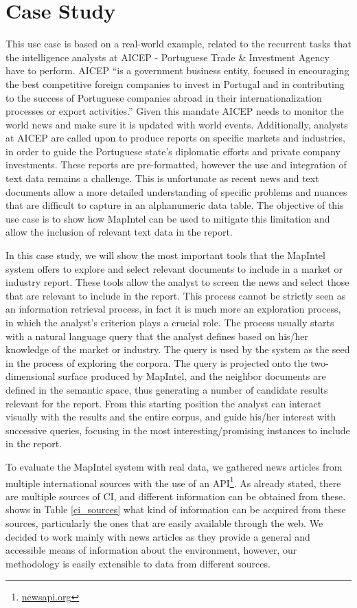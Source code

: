 \documentclass[a4paper]{article}
\begin{document}
\section{Case Study}
This use case is based on a real-world example, related to the recurrent tasks that the intelligence analysts at AICEP - Portuguese Trade \& Investment Agency have to perform. AICEP “is a government business entity, focused in encouraging the best competitive foreign companies to invest in Portugal and in contributing to the success of Portuguese companies abroad in their internationalization processes or export activities.” Given this mandate AICEP needs to monitor the world news and make sure it is updated with world events. Additionally, analysts at AICEP are called upon to produce reports on specific markets and industries, in order to guide the Portuguese state's diplomatic efforts and private company investments. These reports are pre-formatted, however the use and integration of text data remains a challenge. This is unfortunate as recent news and text documents allow a more detailed understanding of specific problems and nuances that are difficult to capture in an alphanumeric data table. The objective of this use case is to show how MapIntel can be used to mitigate this limitation and allow the inclusion of relevant text data in the report.

In this case study, we will show the most important tools that the MapIntel system offers to explore and select relevant documents to include in a market or industry report. These tools allow the analyst to screen the news and select those that are relevant to include in the report. This process cannot be strictly seen as an information retrieval process, in fact it is much more an exploration process, in which the analyst’s criterion plays a crucial role. The process usually starts with a natural language query that the analyst defines based on his/her knowledge of the market or industry. The query is used by the system as the seed in the process of exploring the corpora. The query is projected onto the two-dimensional surface produced by MapIntel, and the neighbor documents are defined in the semantic space, thus generating a number of candidate results relevant for the report. From this starting position the analyst can interact visually with the results and the entire corpus, and guide his/her interest with successive queries, focusing in the most interesting/promising instances to include in the report.

To evaluate the MapIntel system with real data, we gathered news articles from multiple international sources with the use of an API\footnote{\href{https://newsapi.org/}{newsapi.org}}. As already stated, there are multiple sources of CI, and different information can be obtained from these. \citet{dey2011} shows in Table \ref{ci_sources} what kind of information can be acquired from these sources, particularly the ones that are easily available through the web. We decided to work mainly with news articles as they provide a general and accessible means of information about the environment, however, our methodology is easily extensible to data from different sources. 
\end{document}

